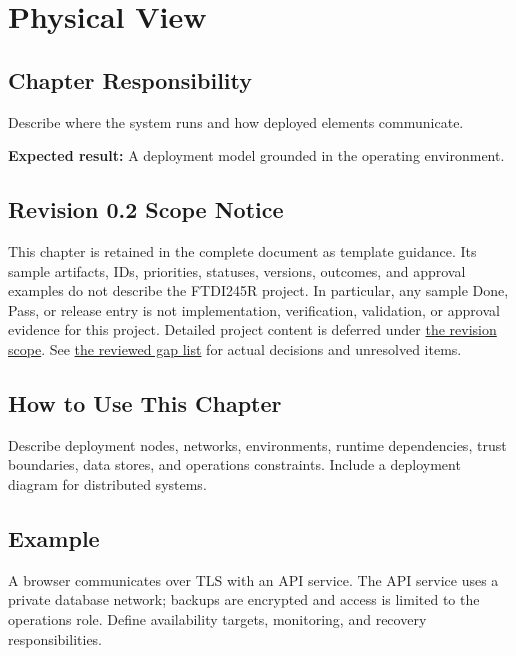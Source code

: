 \chapter{Physical View}
\section{Chapter Responsibility}
\label{Section:PhysicalViewResponsibility}
Describe where the system runs and how deployed elements communicate.

\noindent\textbf{Expected result:} A deployment model grounded in the operating environment.

\section{Revision 0.2 Scope Notice}
\label{Section:DeferredPhysicalView}
\begin{fsaNote}
This chapter is retained in the complete document as template guidance.
Its sample artifacts, IDs, priorities, statuses, versions, outcomes, and
approval examples do not describe the FTDI245R project. In particular, any
sample Done, Pass, or release entry is not implementation, verification,
validation, or approval evidence for this project. Detailed project content
is deferred under \hyperref[Section:ProjectScope]{the revision scope}.
See \hyperref[Table:ProjectGapReview]{the reviewed gap list} for actual
decisions and unresolved items.
\end{fsaNote}

\section{How to Use This Chapter}
Describe deployment nodes, networks, environments, runtime dependencies, trust boundaries, data stores, and operations constraints. Include a deployment diagram for distributed systems.
\section{Example}
A browser communicates over TLS with an API service. The API service uses a private database network; backups are encrypted and access is limited to the operations role. Define availability targets, monitoring, and recovery responsibilities.
